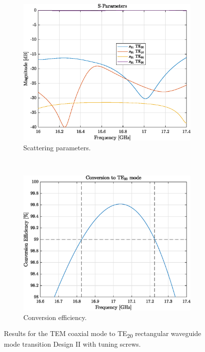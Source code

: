 \documentclass[english,twoside]{article}
\begin{document}
		\begin{figure}[H]
			\centering			
			\begin{subfigure}[b]{0.48\textwidth}
				\includegraphics[width=\textwidth]{figures/coaxToWrTE20_alternative}
				\caption{Scattering parameters.}
			\end{subfigure}
			~
			\begin{subfigure}[b]{0.48\textwidth}
				\includegraphics[width=\textwidth]{figures/coaxToWrTE20_alternative_eff}
				\caption{Conversion efficiency.}
			\end{subfigure}
			\caption{Results for the TEM coaxial mode to TE\textsubscript{20} rectangular waveguide mode transition Design II with tuning screws.}
			\label{fig:coaxToWrTE20_alternative}
		\end{figure}
	
\end{document}
